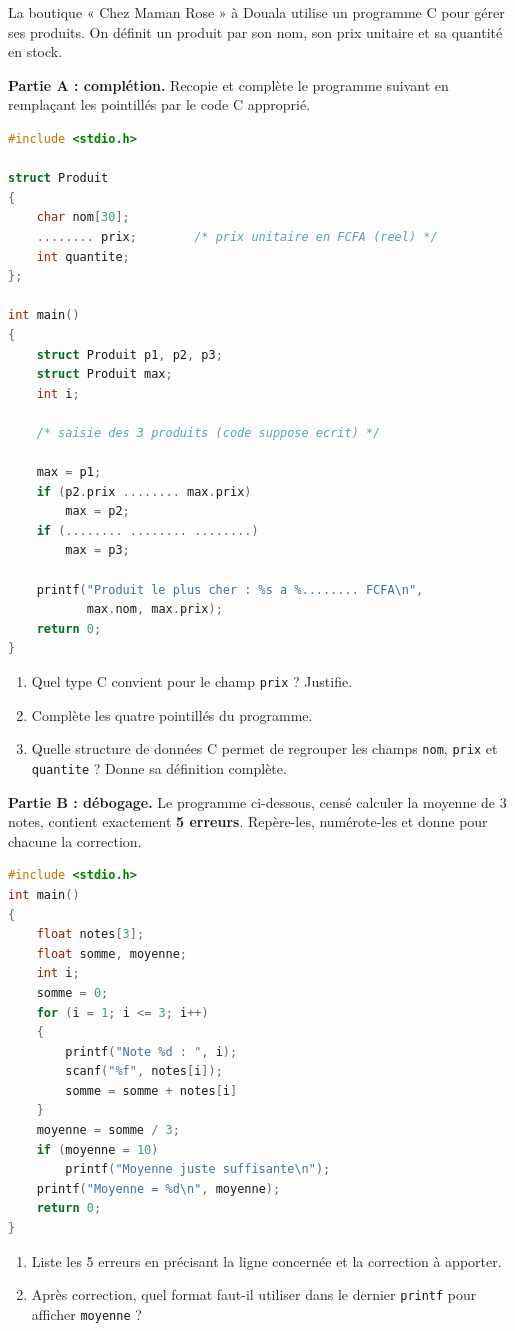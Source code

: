\documentclass[11pt]{article}
\begin{document}
\begin{exercice}
La boutique « Chez Maman Rose » à Douala utilise un programme C pour gérer ses produits. On définit un produit par son nom, son prix unitaire et sa quantité en stock.

\textbf{Partie A : complétion.} Recopie et complète le programme suivant en remplaçant les pointillés par le code C approprié.

\begin{lstlisting}[language=C]
#include <stdio.h>

struct Produit
{
    char nom[30];
    ........ prix;        /* prix unitaire en FCFA (reel) */
    int quantite;
};

int main()
{
    struct Produit p1, p2, p3;
    struct Produit max;
    int i;

    /* saisie des 3 produits (code suppose ecrit) */

    max = p1;
    if (p2.prix ........ max.prix)
        max = p2;
    if (........ ........ ........)
        max = p3;

    printf("Produit le plus cher : %s a %........ FCFA\n",
           max.nom, max.prix);
    return 0;
}
\end{lstlisting}

\begin{enumerate}
  \item Quel type C convient pour le champ \texttt{prix} ? Justifie.
  \item Complète les quatre pointillés du programme.
  \item Quelle structure de données C permet de regrouper les champs \texttt{nom}, \texttt{prix} et \texttt{quantite} ? Donne sa définition complète.
\end{enumerate}

\textbf{Partie B : débogage.} Le programme ci-dessous, censé calculer la moyenne de 3 notes, contient exactement \textbf{5 erreurs}. Repère-les, numérote-les et donne pour chacune la correction.

\begin{lstlisting}[language=C]
#include <stdio.h>
int main()
{
    float notes[3];
    float somme, moyenne;
    int i;
    somme = 0;
    for (i = 1; i <= 3; i++)
    {
        printf("Note %d : ", i);
        scanf("%f", notes[i]);
        somme = somme + notes[i]
    }
    moyenne = somme / 3;
    if (moyenne = 10)
        printf("Moyenne juste suffisante\n");
    printf("Moyenne = %d\n", moyenne);
    return 0;
}
\end{lstlisting}

\begin{enumerate}
  \item[4.] Liste les 5 erreurs en précisant la ligne concernée et la correction à apporter.
  \item[5.] Après correction, quel format faut-il utiliser dans le dernier \texttt{printf} pour afficher \texttt{moyenne} ?
\end{enumerate}
\end{exercice}
\end{document}
